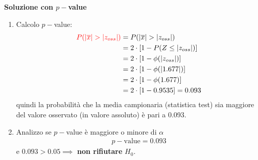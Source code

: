 \documentclass{article}  %
\theoremstyle{definition}
\begin{document}
\begin{esempio}
\begin{enumerate}
	\end{enumerate}
	\begin{center}
		\textbf{Soluzione con $p-$value}
	\end{center}
	\begin{enumerate}
		\item Calcolo $p-$value:
		      \begin{align*}
			      \textcolor{red}{P(|\overline{x}|> |z_{oss}|)} & = P(|{\overline{x}}|> |z_{oss}|)  \\
			                                                    & = 2 \cdot [1-P(Z \leq |z_{oss}|)] \\
			                                                    & = 2 \cdot [1- \phi(|z_{oss}|)]    \\
			                                                    & = 2 \cdot [1- \phi(|1.677|)]      \\
			                                                    & = 2 \cdot [1- \phi(1.677)]        \\
			                                                    & = 2 \cdot [1- 0.9535] = 0.093
		      \end{align*}
		      quindi la probabilità che la media campionaria (statistica test) sia maggiore del valore osservato (in valore assoluto) è pari a 0.093.
		\item Analizzo se $p-$value è maggiore o minore di $\alpha$
		      \begin{align*}
			      p-\text{value} = 0.093
		      \end{align*}
		      e $0.093 > 0.05 \implies$ \textbf{non rifiutare} $H_0$.
	\end{enumerate}
\end{esempio}
\end{document}
